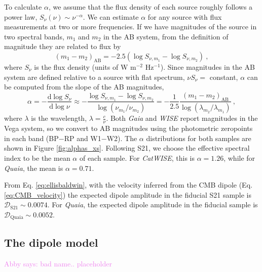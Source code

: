 \documentclass[modern]{aastex631}
\newcommand{\abby}[1]{\textcolor{violet}{Abby says: #1}}
\newcommand{\catwise}{\textsl{CatWISE}\xspace}
\newcommand{\quaia}{\textsl{Quaia}\xspace}
\newcommand{\gaia}{\textsl{Gaia}\xspace}
\newcommand{\wise}{\textsl{WISE}\xspace}
\newcommand{\dd}{\mathrm{d}}
\begin{document}
To calculate $\alpha$, we assume that the flux density of each source roughly follows a power law, $S_\nu(\nu)\sim\nu^{-\alpha}$.
We can estimate $\alpha$ for any source with flux measurements at two or more frequencies.
If we have magnitudes of the source in two spectral bands, $m_1$ and $m_2$ in the AB system, from the definition of magnitude they are related to flux by
\begin{equation}
    (m_1-m_2)_\mathrm{AB}=-2.5(\log S_{\nu,m_1}-\log S_{\nu,m_2}) ~,
\end{equation}
where $S_{\nu}$ is the flux density (units of W m$^{-2}$ Hz$^{-1}$).
Since magnitudes in the AB system are defined relative to a source with flat spectrum, $\nu S_\nu=$ constant, $\alpha$ can be computed from the slope of the AB magnitudes,
\begin{equation}
    \alpha = -\frac{\dd\log S_\nu}{\dd\log\nu} \approx -\frac{\log S_{\nu,m_1}-\log S_{\nu,m_2}}{\log\left(\nu_{m_1}/\nu_{m_2}\right)} = -\frac{1}{2.5}\frac{(m_1-m_2)_{\mathrm{AB}}}{\log(\lambda_{m_2}/\lambda_{m_1})} ~,
\end{equation}
where $\lambda$ is the wavelength, $\lambda=\frac{c}{\nu}$.
Both \gaia and \wise report magnitudes in the Vega system, so we convert to AB magnitudes using the photometric zeropoints in each band (BP$-$RP and W1$-$W2).
The $\alpha$ distributions for both samples are shown in Figure \ref{fig:alphas_xs}.
Following S21, we choose the effective spectral index to be the mean $\alpha$ of each sample.
For \catwise, this is $\alpha=1.26$, while for \quaia, the mean is $\alpha=0.71$.

From Eq. \ref{eq:ellisbaldwin}, with the velocity inferred from the CMB dipole (Eq. \ref{eq:CMB_velocity}) the expected dipole amplitude in the fiducial S21 sample is $\mathcal{D}_\mathrm{S21}\sim 0.0074$.
For \quaia, the expected dipole amplitude in the fiducial sample is $\mathcal{D}_\mathrm{Quaia}\sim 0.0052$.

\subsection{The dipole model}
\label{sec:dipole_model}

\abby{bad name.. placeholder}
\end{document}
